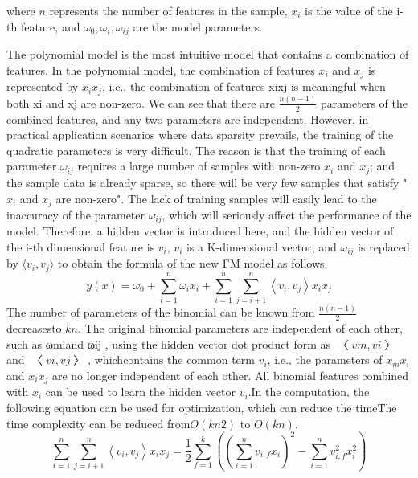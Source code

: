 \documentclass[11pt,en]{elegantpaper}
\begin{document}
where $n$ represents the number of features in the sample, $x_i$ is the value of the i-th feature, and
$ω_0, ω_i, ω_{ij}$ are the model parameters.

The polynomial model is the most intuitive model that contains a combination of features. In the polynomial model, the combination of features $x_i$ and $x_j$ is represented by $x_i x_j$, i.e., the combination of features xixj is meaningful when both xi and xj are non-zero. We can see that there are $\frac{n(n-1)}{2}$ parameters of the combined features, and any two parameters are independent. However, in practical application scenarios where data sparsity prevails, the training of the quadratic parameters is very difficult. The reason is that the training of each parameter $ω_{ij}$ requires a large number of samples with non-zero $x_i$ and $x_j$; and the sample data is already sparse, so there will be very few samples that satisfy "$x_i$ and $x_j$ are non-zero". The lack of training samples will easily lead to the inaccuracy of the parameter $ω_{ij}$, which will seriously affect the performance of the model. Therefore, a hidden vector is introduced here, and the hidden vector of the i-th dimensional feature is $v_i$, $v_i$ is a K-dimensional vector, and  $ω_{ij}$ is replaced by $\langle v_i, v_j\rangle$ to obtain the formula of the new FM model as follows.
$$
y(x)=\omega_{0}+\sum_{i=1}^{n} \omega_{i} x_{i}+\sum_{i=1}^{n} \sum_{j=i+1}^{n}\left\langle v_{i}, v_{j}\right\rangle x_{i} x_{j}
$$
The number of parameters of the binomial can be known from $\frac{n(n-1)}{2}$ decreasesto $kn$. The original binomial parameters are independent of each other, such as ωmiand ωij , using the hidden vector dot product form as $〈vm, vi〉$ and $〈vi, vj〉$, whichcontains the common term $v_i$, i.e., the parameters of $x_m x_i$ and $x_i x_j$ are no longer independent of each other. All binomial features combined with $x_i$ can be used to learn the hidden vector $v_i$.In the computation, the following equation can be used for optimization, which can reduce the timeThe time complexity can be reduced from$ O(kn2)$ to $O(kn)$.
$$
\sum_{i=1}^{n} \sum_{j=i+1}^{n}\left\langle v_{i}, v_{j}\right\rangle x_{i} x_{j}=\frac{1}{2} \sum_{f=1}^{k}\left(\left(\sum_{i=1}^{n} v_{i, f} x_{i}\right)^{2}-\sum_{i=1}^{n} v_{i, f}^{2} x_{i}^{2}\right)
$$
\end{document}
